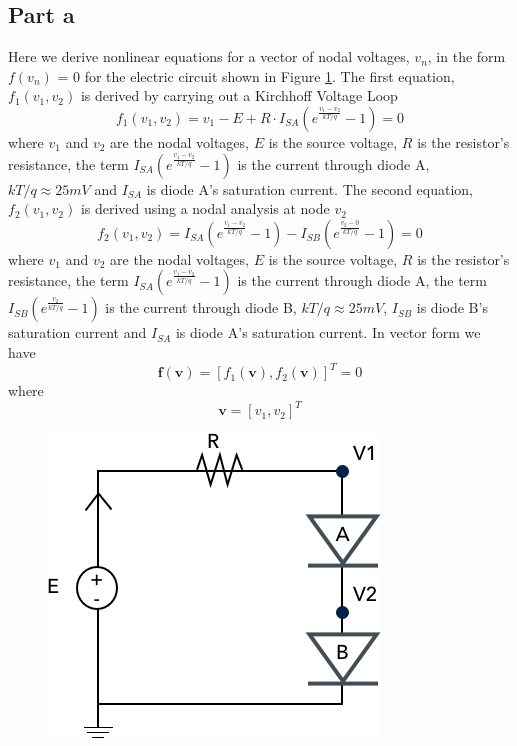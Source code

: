 \documentclass[11pt]{article}
\begin{document}
\subsection*{Part a}
Here we derive nonlinear equations for a vector of nodal voltages, $v_n$, in the form $f(v_n)$ = 0 for the electric circuit shown in Figure \ref{fig:circuit_Q2}. The first equation, $f_1(v_1, v_2)$ is derived by carrying out a Kirchhoff Voltage Loop
$$\boxed{f_1(v_1, v_2) = v_1 - E + R \cdot I_{SA}(e^{\frac{v_1 - v_2}{kT/q}} - 1) = 0}$$
where $v_1$ and $v_2$ are the nodal voltages, $E$ is the source voltage, $R$ is the resistor's resistance, the term $I_{SA}(e^{\frac{v_1 - v_2}{kT/q}} - 1)$ is the current through diode A, $kT/q \approx 25mV$ and $I_{SA}$ is diode A's saturation current. The second equation, $f_2(v_1, v_2)$ is derived using a nodal analysis at node $v_2$
$$\boxed{f_2(v_1, v_2) = I_{SA}(e^{\frac{v_1 - v_2}{kT/q}} - 1) - I_{SB}(e^{\frac{v_2 - 0}{kT/q}} - 1) = 0}$$
where $v_1$ and $v_2$ are the nodal voltages, $E$ is the source voltage, $R$ is the resistor's resistance, the term $I_{SA}(e^{\frac{v_1 - v_2}{kT/q}} - 1)$ is the current through diode A,  the term $I_{SB}(e^{\frac{v_2}{kT/q}} - 1)$ is the current through diode B, $kT/q \approx 25mV$, $I_{SB}$ is diode B's saturation current and  $I_{SA}$ is diode A's saturation current. In vector form we have
$$\mathbf{f(\mathbf{v})} = [f_1(\mathbf{v}), f_2(\mathbf{v})]^T = 0$$
where
$$\mathbf{v} = [v_1, v_2]^T$$
\begin{figure}[!hbp]
	\begin{center}
		\begin{minipage}{0.4 \textwidth}
			\includegraphics[width= \textwidth]{circuit_Q2.png}\\
			\caption{\label{fig:circuit_Q2}}
		\end{minipage}
	\end{center}
\end{figure}
\end{document}
